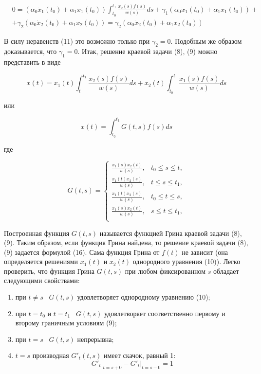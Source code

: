 \documentclass{article}
\theoremstyle{plain} \newtheorem*{theorem*}{Теорема}
\theoremstyle{plain} \newtheorem{theorem}{Теорема}[section]
\theoremstyle{defintition} \newtheorem*{corollary*}{Следствие}
\theoremstyle{plain} \newtheorem*{example*}{Пример}
\theoremstyle{plain} \newtheorem*{remark*}{Замечание}
\begin{document}
\begin{align*}
    & 0 = (\alpha_0 \dot{x}_1(t_0) + \alpha_1 x_1(t_0))
    \int^{t_1}_{t_0} \frac{x_2(s)f(s)}{w(s)} ds +
    \gamma_1
    (\alpha_0 \dot{x}_1(t_0) + \alpha_1 x_1(t_0)) + \\
    & + \gamma_2(\alpha_0 \dot{x}_2(t_0) + \alpha_1 x_2(t_0))
    = \gamma_2(\alpha_0 \dot{x}_2(t_0) + \alpha_1 x_2(t_0))
\end{align*}

В силу  неравенств (11) это возможно только при $\gamma_2 = 0$.
Подобным же образом доказывается, что $\gamma_1 = 0$.
Итак, решение краевой задачи (8), (9) можно
представить в виде

\begin{equation*}
    x(t) =
    x_1(t)\int^{t_1}_t \frac{x_2(s)f(s)}{w(s)} ds +
    x_2(t)\int^t_{t_0} \frac{x_1(s)f(s)}{w(s)} ds
\end{equation*}

или

\begin{equation}
    x(t) = \int^{t_1}_{t_0} G(t, s) f(s) ds
\end{equation}

где

\begin{equation}
    G(t,s) =
    \begin{cases}
        \frac{x_1(s) x_2(t)}{w(s)} , &t_0 \le s \le t,\\
        \frac{x_1(t) x_2(s)}{w(s)} , &t \le s \le t_1,\\
        \frac{x_1(t) x_2(s)}{w(s)} , &t_0 \le t \le s,\\
        \frac{x_1(s) x_2(t)}{w(s)} , &s \le t \le t_1,\\
    \end{cases}
\end{equation}

Построенная функция $G(t,s)$ называется функцией Грина
краевой задачи (8), (9). Таким образом, если функция
Грина найдена, то решение краевой задачи (8), (9) задается
формулой (16). Сама функция Грина от $f(t)$ не зависит
(она определяется решениями $x_1(t)$ и $x_2(t)$ однородного
уравнения (10)).
Легко проверить, что функция Грина $G(t,s)$ при любом
фиксированном $s$ обладает следующими свойствами:

\begin{enumerate}
    \item при $t \ne s$ \ $G(t,s)$ удовлетворяет однородному
        уравнению (10);
    \item при $t = t_0$ и $t = t_1$ \ $G(t,s)$ удовлетворяет
        соответственно первому и второму граничным условиям (9);
    \item при $t = s$ \ $G(t,s)$ непрерывна;
    \item $t = s$ производная $G'_t(t,s)$ имеет скачок, равный 1:
        \begin{equation*}
            G'_t \vert_{t = s + 0} - G'_t \vert_{t = s - 0} = 1
        \end{equation*}
\end{enumerate}
\end{document}
